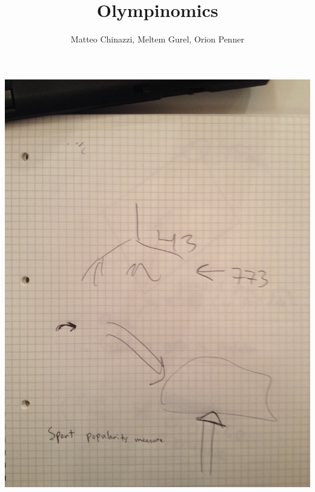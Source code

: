 \documentclass[9pt]{beamer}		%
\title[Olympinomics] {Olympinomics}
\author{Matteo Chinazzi, Meltem G\:urel, Orion Penner}
\begin{document}
\begin{frame}%
  \titlepage
\end{frame}

\begin{frame}
     \begin{center}
            \includegraphics[width=1\textwidth]{../images/image.jpeg}
    \end{center}
\end{frame}
\end{document}
